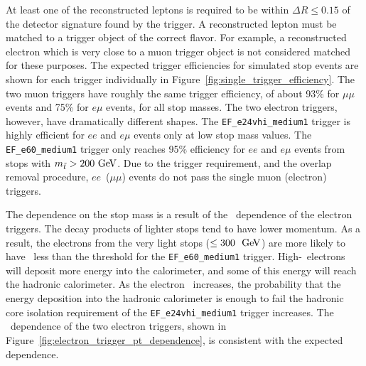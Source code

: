 \begin{table}[ht]
  \caption{
    Requirements for the triggers used in this analysis.
  }
  \label{tab:trigger_defs}
\end{table}

At least one of the reconstructed leptons is required to be within 
$\Delta R \leq 0.15$ of the detector signature found by the trigger.
A reconstructed lepton must be matched to a trigger object of the correct flavor.
For example, a reconstructed electron which is very close to a muon trigger
object is not considered matched for these purposes.
The expected trigger efficiencies for simulated stop events are shown
for each trigger individually in Figure~\ref{fig:single_trigger_efficiency}.
The two muon triggers have roughly the same trigger efficiency, of about 93\% 
for $\mu\mu$ events and 75\% for $e\mu$ events, for all stop masses.
The two electron triggers, however, have dramatically different shapes.
The \texttt{EF\_e24vhi\_medium1} trigger is highly efficient for $ee$ and
$e\mu$ events only at low stop mass values.
The \texttt{EF\_e60\_medium1} trigger only reaches 95\% efficiency for
$ee$ and $e\mu$ events from stops with $m_{\tilde{t}} > 200 \GeV$.
Due to the trigger requirement, and the overlap removal procedure,
$ee$~($\mu\mu$) events do not pass the single muon (electron) triggers.

The dependence on the stop mass is a result of the \ET\ dependence of the
electron triggers.
The decay products of lighter stops tend to have lower momentum.
As a result, the electrons from the very light stops ($\leq 300~\GeV$) 
are more likely to have \ET\ less than the threshold for the
\texttt{EF\_e60\_medium1} trigger.
High-\ET\ electrons will deposit more energy into the calorimeter,
and some of this energy will reach the hadronic calorimeter.
As the electron \ET\ increases, the probability that the energy deposition into
the hadronic calorimeter is enough to fail the hadronic core isolation
requirement of the \texttt{EF\_e24vhi\_medium1} trigger increases.
The \ET\ dependence of the two electron triggers, shown in
Figure~\ref{fig:electron_trigger_pt_dependence}, is consistent with the expected
dependence.

